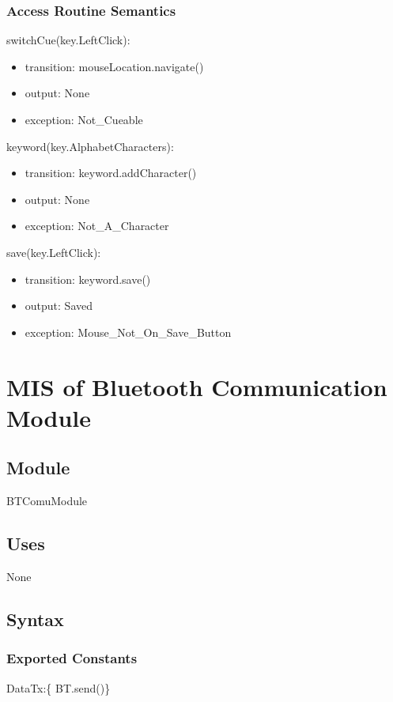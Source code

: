 \documentclass[12pt, titlepage]{article}
\begin{document}
\subsubsection{Access Routine Semantics}

\noindent switchCue(key.LeftClick):
\begin{itemize}
\item transition: mouseLocation.navigate() 
\item output: None
\item exception: Not\_Cueable 
\end{itemize}

\noindent keyword(key.AlphabetCharacters):
\begin{itemize}
\item transition: keyword.addCharacter()
\item output: None
\item exception: Not\_A\_Character 
\end{itemize}

\noindent save(key.LeftClick):
\begin{itemize}
\item transition: keyword.save() 
\item output: Saved
\item exception: Mouse\_Not\_On\_Save\_Button 
\end{itemize}

\newpage

\section{MIS of Bluetooth Communication Module} \label{BTComuModule} 


\subsection{Module}

BTComuModule

\subsection{Uses}

None

\subsection{Syntax}

\subsubsection{Exported Constants}
DataTx:\{ BT.send()\}
\end{document}
